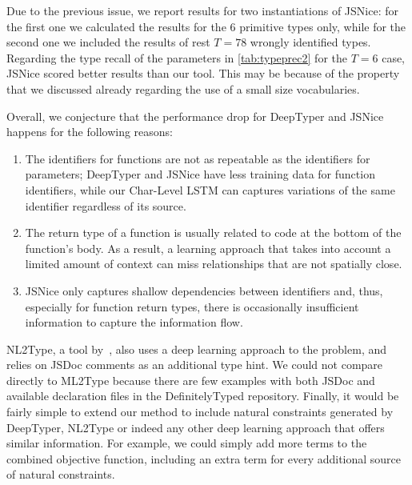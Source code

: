 \documentclass[sigplan,10pt,review,anonymous]{acmart} %
\newcommand{\margincomment}[2]{\marginpar{\scriptsize\color{Maroon}#1 says: #2}}
\newcommand{\ivp}[1]{\margincomment{IVP}{#1}}
\theoremstyle{plain}
\theoremstyle{remark}
\theoremstyle{definition}
\begin{document}
Due to the previous issue, we report results for two instantiations of JSNice:
for the first one we calculated the results for the 6 primitive types only,
while for the second one we included the results of rest $T=78$ wrongly identified types.
Regarding the type recall of the parameters in \cref{tab:typeprec2} for the $T=6$ case,
JSNice scored better results than our tool.
This may be because of the property that we discussed already regarding the use of a small size vocabularies.

Overall, we conjecture that the performance drop for DeepTyper and JSNice happens for the following reasons:
\begin{enumerate}[label=(\roman*)]
	\item The identifiers for functions are not as repeatable as the identifiers for parameters;
	      DeepTyper and JSNice have less training data for function identifiers,
	      while our Char-Level LSTM can captures variations of the same identifier regardless of its source.
	\item The return type of a function is usually related to code at the bottom of the function's body.
	      As a result, a learning approach that takes into account a limited amount of context
	      can miss relationships that are not spatially close.
	\item JSNice only captures shallow dependencies between identifiers and, thus,
	      especially for function return types, there is occasionally insufficient information
	      to capture the information flow.
\end{enumerate}

NL2Type, a tool by~\cite{malik19}, also uses
a deep learning approach to the problem, and  relies on JSDoc comments as
an additional type hint.
%
We could not compare directly to ML2Type because
there are few examples with both JSDoc and available declaration
files in the DefinitelyTyped repository.
%
Finally, it would be fairly simple to extend our method to include natural constraints generated by DeepTyper, NL2Type or
indeed any other deep learning approach that offers similar information.
For example, we could simply add more terms to the combined objective function,
including an extra term for every additional source of natural constraints.
\end{document}

